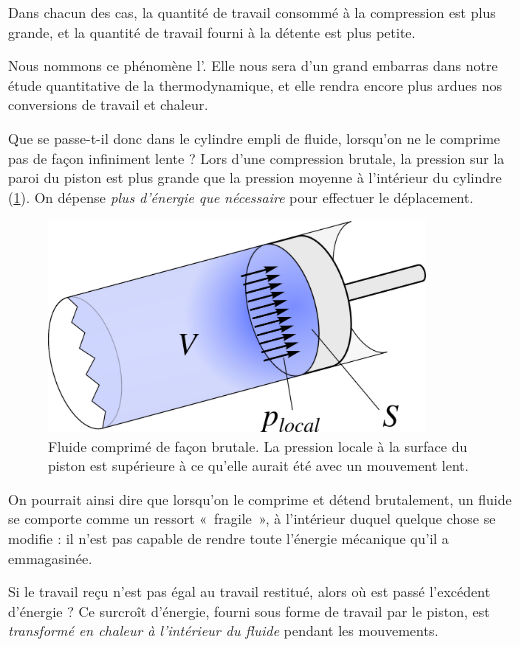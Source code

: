 		\clearfloats %

		Dans chacun des cas, la quantité de travail consommé à la compression est plus grande, et la quantité de travail fourni à la détente est plus petite.
		
		Nous nommons ce phénomène l’. Elle nous sera d’un grand embarras dans notre étude quantitative de la thermodynamique, et elle rendra encore plus ardues nos conversions de travail et chaleur.

		Que se passe-t-il donc dans le cylindre empli de fluide, lorsqu’on ne le comprime pas de façon infiniment lente ? Lors d’une compression brutale, la pression sur la paroi du piston est plus grande que la pression moyenne à l’intérieur du cylindre (\cref{fig_piston_fluide_rapide}). On dépense \emph{plus d’énergie que nécessaire} pour effectuer le déplacement.

		\begin{figure}
			\begin{center}
				\includegraphics[width=10cm]{images/travail_cylindre_3.png}
			\end{center}
			\caption{Fluide comprimé de façon brutale. La pression locale à la surface du piston est supérieure à ce qu’elle aurait été avec un mouvement lent.}
			\label{fig_piston_fluide_rapide}
		\end{figure}

		On pourrait ainsi dire que lorsqu’on le comprime et détend brutalement, un fluide se comporte comme un ressort «~fragile~», à l’intérieur duquel quelque chose se modifie : il n’est pas capable de rendre toute l’énergie mécanique qu’il a emmagasinée.

		Si le travail reçu n’est pas égal au travail restitué, alors où est passé l’excédent d’énergie ? Ce surcroît d’énergie, fourni sous forme de travail par le piston, est \emph{transformé en chaleur à l’intérieur du fluide} pendant les mouvements. 

